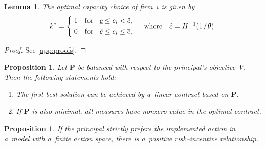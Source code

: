 \documentclass[11pt, a4paper, oneside]{article}
\newlength{\baselinedist}
\newcommand*{\divslash}{%
	\mathbin{%
		\nonscript\mskip-2mu / \nonscript\mskip-2mu%
	}%
}  %
\theoremstyle{Plain}
\newtheorem{lemma}[theorem]{Lemma}
\newtheorem{proposition}[theorem]{Satz}
\newtheorem{proposition}[theorem]{Proposition}
\theoremstyle{Definition}
\theoremstyle{Remark}
\begin{document}

\begin{lemma}
	\label{lemma:budde-goex-1}
	The optimal capacity choice of firm~$i$ is given by
	\begin{equation}
		\label{eq:opt-capacity}
		k^* =
		\begin{cases*}
			\strut \; 1 & for\;\; $\underline{c} \leq c_i < \hat{c}$, \\
			\strut \; 0 & for\;\; $\hat{c} \leq c_i \leq \overline{c}$,
		\end{cases*}
		\quad \text{where} \quad \hat{c} = H^{-1}(1 \divslash \theta).
	\end{equation}
\end{lemma}

\begin{proof}
	See \autoref{app:proofs}.
\end{proof}

\begin{proposition}
	\label{proposition:budde-1}
	Let $\bm{P}$ be balanced with respect to the principal's objective~$V$. Then the following statements hold:
	\begin{enumerate}[label = (\roman*), align = right, leftmargin = \baselinedist, labelsep = 0.3\baselinedist]
		\item The first-best solution can be achieved by a~linear contract based on $\bm{P}$.
		\item If $\bm{P}$ is also minimal, all measures have nonzero value in the optimal contract.
	\end{enumerate}
\end{proposition}

\begin{proposition}
	\label{proposition:budde-kraekel-3}
	If the principal strictly prefers the implemented action in a~model with a~finite action space, there is a~positive risk--incentive relationship.
\end{proposition}
\end{document}
